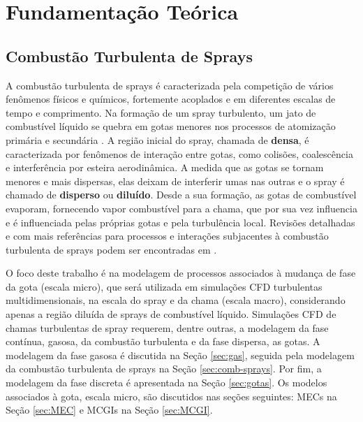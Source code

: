

\section{Fundamentação Teórica}


\subsection{Combustão Turbulenta de Sprays} \label{sec:teoria}

A combustão turbulenta de sprays é caracterizada pela competição de vários fenômenos físicos e químicos, fortemente acoplados e em diferentes escalas de tempo e comprimento. 
Na formação de um spray turbulento, um jato de combustível líquido se quebra em gotas menores nos processos de atomização primária e secundária \cite{JennyB2012}.
A região inicial do spray, chamada de \textbf{densa}, é caracterizada por fenômenos de interação entre gotas, como colisões, coalescência e interferência por esteira aerodinâmica.
A medida que as gotas se tornam menores e mais dispersas, elas deixam de interferir umas nas outras e o spray é chamado de \textbf{disperso} ou \textbf{diluído}. 
Desde a sua formação, as gotas de combustível evaporam, fornecendo vapor combustível para a chama, que por sua vez influencia e é influenciada pelas próprias gotas e pela turbulência local.
Revisões detalhadas e com mais referências para processos e interações subjacentes à combustão turbulenta de sprays podem ser encontradas em \cite{JennyB2012, MasriA2016, SanchezA2015, ZhouL2021,JiangX2010}.

O foco deste trabalho é na modelagem de processos associados à mudança de fase da gota (escala micro), que será utilizada em simulações CFD turbulentas multidimensionais, na escala do spray e da chama (escala macro), considerando apenas a região diluída de sprays de combustível líquido.
Simulações CFD  de chamas turbulentas de spray requerem, dentre outras, a modelagem da fase contínua, gasosa, da combustão turbulenta e da fase dispersa, as gotas.
A modelagem da fase gasosa é discutida na Seção \ref{sec:gas}, seguida pela modelagem da combustão turbulenta de sprays na Seção \ref{sec:comb-sprays}. 
Por fim, a modelagem da fase discreta é apresentada na Seção \ref{sec:gotas}.
Os modelos associados à gota, escala micro, são discutidos nas seções seguintes: MECs na Seção	\ref{sec:MEC} e MCGIs na Seção \ref{sec:MCGI}.


